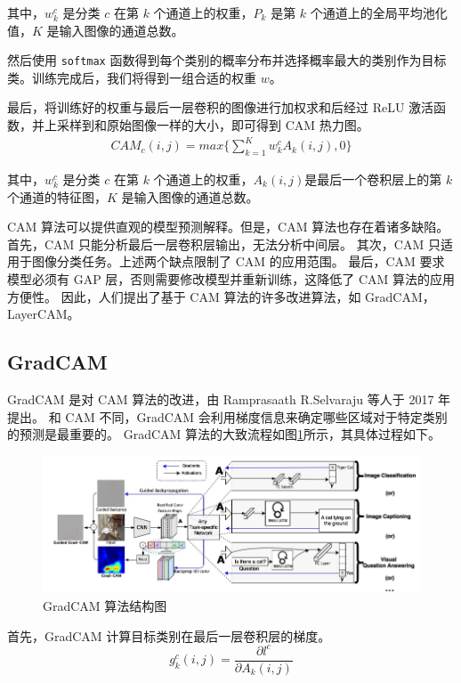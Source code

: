 \documentclass[supercite]{Experimental_Report}
\theoremstyle{definition}
\begin{document}
其中，$w_k^c$ 是分类 $c$ 在第 $k$ 个通道上的权重，$P_k$ 是第 $k$ 个通道上的全局平均池化值，$K$ 是输入图像的通道总数。

然后使用 \texttt{softmax} 函数得到每个类别的概率分布并选择概率最大的类别作为目标类。训练完成后，我们将得到一组合适的权重 $w$。

最后，将训练好的权重与最后一层卷积的图像进行加权求和后经过 ReLU 激活函数，并上采样到和原始图像一样的大小，即可得到 CAM 热力图。
\begin{eqnarray}
  CAM_c(i, j)=max\{\sum_{k=1}^{K}w_k^cA_k(i, j), 0\}
\end{eqnarray}

其中，$w_k^c$ 是分类 $c$ 在第 $k$ 个通道上的权重，$A_k(i, j)$是最后一个卷积层上的第 $k$ 个通道的特征图，$K$ 是输入图像的通道总数。

CAM 算法可以提供直观的模型预测解释。但是，CAM 算法也存在着诸多缺陷。
首先，CAM 只能分析最后一层卷积层输出，无法分析中间层。
其次，CAM 只适用于图像分类任务。上述两个缺点限制了 CAM 的应用范围。
最后，CAM 要求模型必须有 GAP 层，否则需要修改模型并重新训练，这降低了 CAM 算法的应用方便性。
因此，人们提出了基于 CAM 算法的许多改进算法，如 GradCAM，LayerCAM。

\subsection{GradCAM}
GradCAM 是对 CAM 算法的改进，由 Ramprasaath R.Selvaraju 等人于 2017 年提出。
和 CAM 不同，GradCAM 会利用梯度信息来确定哪些区域对于特定类别的预测是最重要的。
GradCAM 算法的大致流程如图\ref{GradCAM}所示，其具体过程如下。
\begin{figure}[H]
	\begin{center}
		\includegraphics[scale=0.6]{../images/GradCAM算法结构图.png}
		\caption{GradCAM 算法结构图}
		\label{GradCAM}
	\end{center}
\end{figure}

首先，GradCAM 计算目标类别在最后一层卷积层的梯度。
\begin{equation}
g_k^c(i, j) = \frac{\partial l^c}{\partial A_k(i, j)}
\end{equation}
\end{document}

